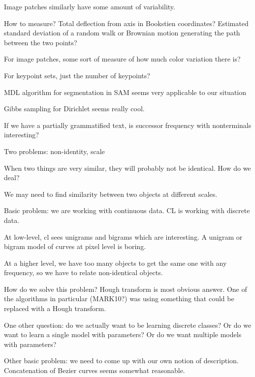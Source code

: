 \documentclass{article}
\begin{document}
  Image patches similarly have some amount of variability.

  How to measure? Total deflection from axis in Bookstien coordinates?
  Estimated standard deviation of a random walk or Brownian motion
  generating the path between the two points?

  For image patches, some sort of measure of how much color variation there is?

  For keypoint sets, just the number of keypoints?

\item MDL algorithm for segmentation in SAM seems very applicable to our situation

\item Gibbs sampling for Dirichlet seems really cool. 

\item If we have a partially grammatified text, is successor frequency
  with nonterminals interesting?

\item Two problems: non-identity, scale

  When two things are very similar, they will probably not be
  identical. How do we deal?

  We may need to find similarity between two objects at different scales.

\item Basic problem: we are working with continuous data. CL is
  working with discrete data.

  At low-level, cl sees unigrams and bigrams which are interesting. A
  unigram or bigram model of curves at pixel level is boring.

  At a higher level, we have too many objects to get the same one with
  any frequency, so we have to relate non-identical objects.

  How do we solve this problem? Hough transform is most obvious
  answer. One of the algorithms in particular (MARK10?) was using
  something that could be replaced with a Hough transform.

  One other question: do we actually want to be learning discrete
  classes? Or do we want to learn a single model with parameters? Or
  do we want multiple models with parameters?

\item Other basic problem: we need to come up with our own notion of
  description. Concatenation of Bezier curves seems somewhat reasonable.

\eitem
\end{document}
